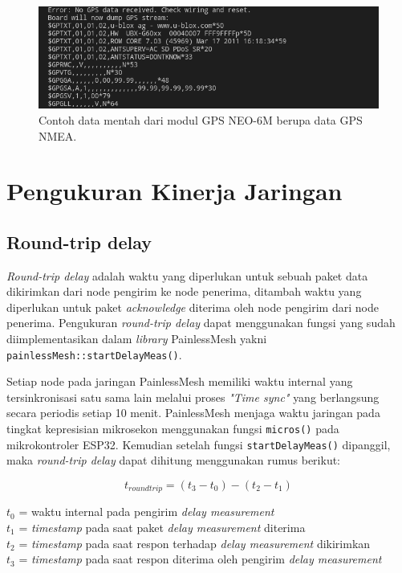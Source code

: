 \begin{figure}[H]
	\centering
	\includegraphics[scale=0.5]{./assets/NMEASentences}
	\caption{Contoh data mentah dari modul GPS NEO-6M berupa data GPS NMEA.}
\end{figure}

\section{Pengukuran Kinerja Jaringan}
\subsection{Round-trip delay}
\textit{Round-trip delay} adalah waktu yang diperlukan untuk sebuah paket data dikirimkan dari node pengirim ke node penerima, ditambah waktu yang diperlukan untuk paket \textit{acknowledge} diterima oleh node pengirim dari node penerima. Pengukuran \textit{round-trip delay} dapat menggunakan fungsi yang sudah diimplementasikan dalam \textit{library} PainlessMesh yakni \verb|painlessMesh::startDelayMeas()|.

Setiap node pada jaringan PainlessMesh memiliki waktu internal yang tersinkronisasi satu sama lain melalui proses \textit{"Time sync"} \cite{MeshProtocolWiki} yang berlangsung secara periodis setiap 10 menit. PainlessMesh menjaga waktu jaringan pada tingkat kepresisian mikrosekon menggunakan fungsi \verb|micros()| pada mikrokontroler ESP32. Kemudian setelah fungsi \verb|startDelayMeas()| dipanggil, maka \textit{round-trip delay} dapat dihitung menggunakan rumus berikut:

\begin{equation}
	 t_{round trip} = (t_3 - t_0) - (t_2 - t_1)
\end{equation}

$t_0$ = waktu internal pada pengirim \textit{delay measurement}\\
$t_1$ = \textit{timestamp} pada saat paket \textit{delay measurement} diterima\\
$t_2$ = \textit{timestamp} pada saat respon terhadap \textit{delay measurement} dikirimkan\\
$t_3$ = \textit{timestamp} pada saat respon diterima oleh pengirim \textit{delay measurement}

